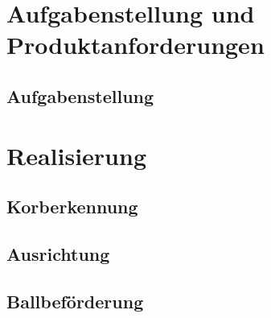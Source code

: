 \begin{frame}
    \titlepage
\end{frame}

\setcounter{tocdepth}{1} %
\begin{frame}
    \tableofcontents
\end{frame}

\section{Aufgabenstellung und Produktanforderungen} %
\subsection{Aufgabenstellung}

\section{Realisierung}


%
\subsection{Korberkennung}



\subsection{Ausrichtung}





\subsection{Ballbeförderung}






